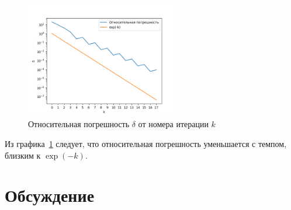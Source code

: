 \documentclass{article}
\begin{document}
  \begin{figure}[htbp!]
		\begin{center}
			\includegraphics[width = 0.6\textwidth]{relative-errors}
			\caption{Относительная погрешность \( \delta \) от номера
        итерации \( k \)}
      \label{figure:relative-errors}
		\end{center}
	\end{figure}

  Из графика~\ref{figure:relative-errors} следует, что относительная
  погрешность уменьшается с темпом, близким к \( \exp(-k) \).

  \clearpage

  \section{Обсуждение}
\end{document}
